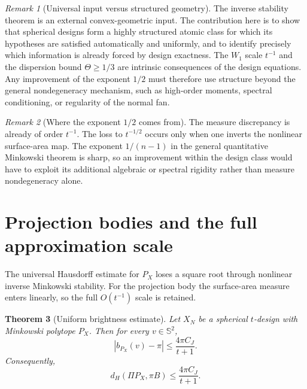 \documentclass[11pt]{article}
\newtheorem{theorem}{Theorem}[section]
\theoremstyle{definition}
\theoremstyle{remark}
\newtheorem{remark}[theorem]{Remark}
\newcommand{\Sph}{\mathbb S}
\begin{document}
\begin{remark}[Universal input versus structured geometry]\label{rem:blackbox}
The inverse stability theorem is an external convex-geometric input. The contribution here is to show that spherical designs form a highly structured atomic class for which its hypotheses are satisfied automatically and uniformly, and to identify precisely which information is already forced by design exactness. The $W_1$ scale $t^{-1}$ and the dispersion bound $\Theta\ge1/3$ are intrinsic consequences of the design equations. Any improvement of the exponent $1/2$ must therefore use structure beyond the general nondegeneracy mechanism, such as high-order moments, spectral conditioning, or regularity of the normal fan.
\end{remark}

\begin{remark}[Where the exponent $1/2$ comes from]\label{rem:exponent-half}
The measure discrepancy is already of order $t^{-1}$. The loss to $t^{-1/2}$ occurs only when one inverts the nonlinear surface-area map. The exponent $1/(n-1)$ in the general quantitative Minkowski theorem is sharp, so an improvement within the design class would have to exploit its additional algebraic or spectral rigidity rather than measure nondegeneracy alone.
\end{remark}

\section{Projection bodies and the full approximation scale}\label{sec:projection}

The universal Hausdorff estimate for $P_X$ loses a square root through nonlinear inverse Minkowski stability. For the projection body the surface-area measure enters linearly, so the full $O(t^{-1})$ scale is retained.

\begin{theorem}[Uniform brightness estimate]\label{thm:brightness}
Let $X_N$ be a spherical $t$-design with Minkowski polytope $P_X$. Then for every $v\in\Sph^2$,
\begin{equation}\label{eq:brightness}
|b_{P_X}(v)-\pi|\le\frac{4\pi C_J}{t+1}.
\end{equation}
Consequently,
\begin{equation}\label{eq:projection-rate}
d_H(\Pi P_X,\pi B)\le\frac{4\pi C_J}{t+1}.
\end{equation}
\end{theorem}
\end{document}

